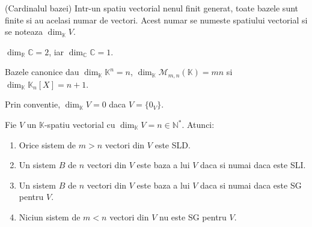 \documentclass{article}
\begin{document}
\begin{enumerate}
  \begin{tcolorbox}
    \teorema (Cardinalul bazei) Intr-un spatiu vectorial nenul finit generat, toate bazele sunt finite si au acelasi numar de vectori. Acest numar se numeste  spatiului vectorial si se noteaza $\dim_{\mathbb{K}} V$.
  \end{tcolorbox}

  \observatie $\dim_{\mathbb{R}} \mathbb{C} = 2$, iar $\dim_{\mathbb{C}} \mathbb{C} = 1$.

  \observatie Bazele canonice dau $\dim_{\mathbb K}\mathbb K^n=n$, $\dim_{\mathbb K}\mathcal M_{m,n}(\mathbb K)=mn$ si $\dim_{\mathbb K}\mathbb K_n[X]=n+1$.

  \observatie Prin conventie, $\dim_{\mathbb{K}} V = 0$ daca $V = \{0_V\}$.

  \corolar Fie $V$ un $\mathbb{K}$-spatiu vectorial cu $\dim_{\mathbb{K}} V = n \in \mathbb{N}^*$. Atunci:
  \begin{enumerate}
    \item Orice sistem de $m > n$ vectori din $V$ este SLD.
    \item Un sistem $B$ de $n$ vectori din $V$ este baza a lui $V$ daca si numai daca este SLI.
    \item Un sistem $B$ de $n$ vectori din $V$ este baza a lui $V$ daca si numai daca este SG pentru $V$.
    \item Niciun sistem de $m < n$ vectori din $V$ nu este SG pentru $V$.
  \end{enumerate}

\end{enumerate}
\end{document}
